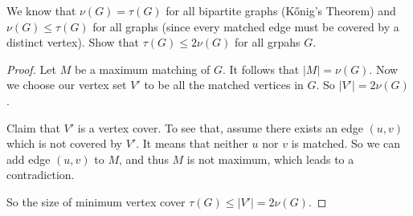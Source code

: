 



    \begin{thm}{}{}
        We know that $\nu(G) = \tau(G)$ for all bipartite graphs (K\H{o}nig's Theorem) and $\nu(G) \leq \tau(G)$ for all graphs (since every matched edge must be covered by a distinct vertex). Show that $\tau(G) \leq 2\nu(G)$ for all grpahs $G$.
    \end{thm}

    \begin{proof}
        Let $M$ be a maximum matching of $G$. It follows that $|M| = \nu(G)$. Now we choose our vertex set $V'$ to be all the matched vertices in $G$. So $|V'| = 2\nu(G)$. 
        
        Claim that $V'$ is a vertex cover. To see that, assume there exists an edge $(u, v)$ which is not covered by $V'$. It means that neither $u$ nor $v$ is matched. So we can add edge $(u, v)$ to $M$, and thus $M$ is not maximum, which leads to a contradiction.
        
        So the size of minimum vertex cover $\tau(G) \leq |V'| = 2\nu(G)$.
    \end{proof}




